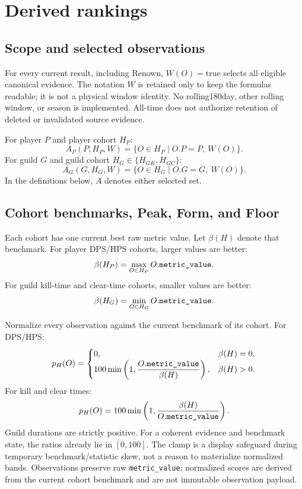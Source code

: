 \documentclass[11pt]{article}
\newcommand{\field}[1]{\texttt{#1}}
\begin{document}
\section{Derived rankings}

\subsection{Scope and selected observations}
For every current result, including Renown, $W(O)=\mathrm{true}$ selects all eligible canonical evidence. The notation $W$ is retained only to keep the formulas readable; it is not a physical window identity. No rolling180day, other rolling window, or season is implemented. All-time does not authorize retention of deleted or invalidated source evidence.

For player $P$ and player cohort $H_P$:
\[
  A_P(P,H_P,W)=\{O\in H_P\mid O.P=P,\ W(O)\}.
\]
For guild $G$ and guild cohort $H_G\in\{H_{GK},H_{GC}\}$:
\[
  A_G(G,H_G,W)=\{O\in H_G\mid O.G=G,\ W(O)\}.
\]
In the definitions below, $A$ denotes either selected set.

\subsection{Cohort benchmarks, Peak, Form, and Floor}
Each cohort has one current best raw metric value. Let $\beta(H)$ denote that benchmark. For player DPS/HPS cohorts, larger values are better:
\[
  \beta(H_P)=\max_{O\in H_P} O.\field{metric\_\allowbreak value}.
\]
For guild kill-time and clear-time cohorts, smaller values are better:
\[
  \beta(H_G)=\min_{O\in H_G} O.\field{metric\_\allowbreak value}.
\]

Normalize every observation against the current benchmark of its cohort. For DPS/HPS:
\[
  p_H(O)=
  \begin{cases}
  0, & \beta(H)=0,\\
  100\min\left(1,\dfrac{O.\field{metric\_\allowbreak value}}{\beta(H)}\right),
    & \beta(H)>0.
  \end{cases}
\]
For kill and clear times:
\[
  p_H(O)=100\min\left(1,
    \frac{\beta(H)}{O.\field{metric\_\allowbreak value}}
  \right).
\]
Guild durations are strictly positive. For a coherent evidence and benchmark state, the ratios already lie in $[0,100]$. The clamp is a display safeguard during temporary benchmark/statistic skew, not a reason to materialize normalized bands. Observations preserve raw \field{metric\_\allowbreak value}; normalized scores are derived from the current cohort benchmark and are not immutable observation payload.
\end{document}
